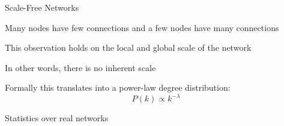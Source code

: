 \begin{frame}{Scale-Free Networks}
\BI
\item Many nodes have few connections and a few nodes have many connections
\item This observation holds on the local and global scale of the network
\item In other words, \alert{there is no inherent scale}
\EI

\begin{definition}
Formally this translates into a power-law degree distribution: 
\[
  P(k) \propto k^{-\lambda}
\]
\end{definition}

\end{frame}

\begin{frame}{Statistics over real networks}


\end{frame}
